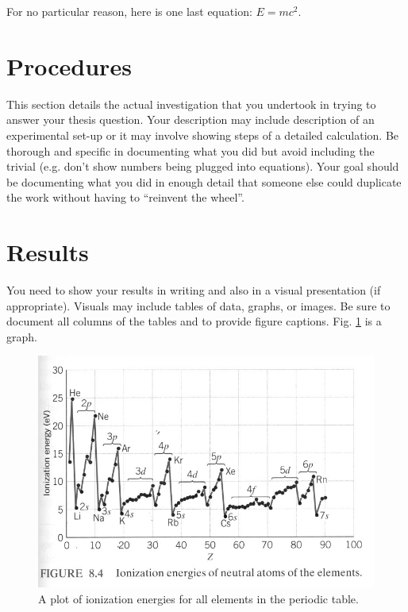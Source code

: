 \documentclass[twocolumn,12pt]{article}
\begin{document}
For no particular reason, here is one last equation:
$ E = mc^2$.

\section{Procedures}
This section details the actual investigation that you undertook in trying to answer your thesis question.  Your description may include description of an experimental set-up or it may involve showing steps of a detailed calculation.  Be thorough and specific in documenting what you did but avoid including the trivial (e.g. don't show numbers being plugged into equations).  Your goal should be documenting what you did in enough detail that someone else could duplicate the work without having to ``reinvent the wheel''. 

\section{Results}
You need to show your results in writing and also in a visual presentation (if appropriate).  Visuals may include tables of data, graphs, or images.  Be sure to document all columns of the tables and to provide figure captions.  Fig. \ref{ion} is a graph.

\begin{figure}[H]
\begin{center}
\includegraphics[width=13cm]{ionize_2d.jpg}
\caption{A plot of ionization energies for all elements in the periodic table.}
\label{ion}
\end{center}
\end{figure}
\end{document}
